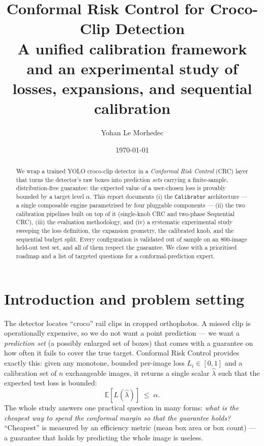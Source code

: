 \documentclass[11pt,a4paper]{article}
\title{\textbf{Conformal Risk Control for Croco-Clip Detection}\\
       \large A unified calibration framework and an experimental study of
       losses, expansions, and sequential calibration}
\author{Yohan Le Morhedec}
\date{\today}
\newcommand{\lamhat}{\hat{\lambda}}
\newcommand{\code}[1]{\texttt{\small #1}}
\begin{document}
\maketitle

\begin{abstract}
We wrap a trained YOLO croco-clip detector in a \emph{Conformal Risk Control}
(CRC) layer that turns the detector's raw boxes into prediction \emph{sets}
carrying a finite-sample, distribution-free guarantee: the expected value of a
user-chosen loss is provably bounded by a target level $\alpha$. This report
documents (i) the \code{Calibrator} architecture --- a single composable engine
parametrised by four pluggable components --- (ii) the two calibration
pipelines built on top of it (single-knob CRC and two-phase Sequential CRC),
(iii) the evaluation methodology, and (iv) a systematic experimental study
sweeping the loss definition, the expansion geometry, the calibrated knob, and
the sequential budget split. Every configuration is validated out of sample on
an $800$-image held-out test set, and all of them respect the guarantee. We
close with a prioritised roadmap and a list of targeted questions for a
conformal-prediction expert.
\end{abstract}

\tableofcontents

\section{Introduction and problem setting}
The detector locates ``croco'' rail clips in cropped orthophotos. A missed clip
is operationally expensive, so we do not want a point prediction --- we want a
\emph{prediction set} (a possibly enlarged set of boxes) that comes with a
guarantee on how often it fails to cover the true target. Conformal Risk Control
provides exactly this: given any monotone, bounded per-image loss
$L_i \in [0,1]$ and a calibration set of $n$ exchangeable images, it returns a
single scalar $\lamhat$ such that the expected test loss is bounded:
\begin{equation}
  \mathbb{E}\!\left[L(\lamhat)\right] \;\le\; \alpha .
  \label{eq:crc-guarantee}
\end{equation}
The whole study answers one practical question in many forms: \emph{what is the
cheapest way to spend the conformal margin so that the guarantee holds?}
``Cheapest'' is measured by an efficiency metric (mean box area or box count) ---
a guarantee that holds by predicting the whole image is useless.
\end{document}
